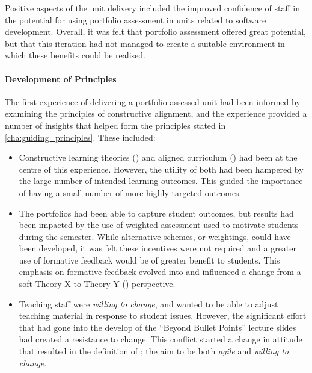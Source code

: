 Positive aspects of the unit delivery included the improved confidence of staff in the potential for using portfolio assessment in units related to software development. Overall, it was felt that portfolio assessment offered great potential, but that this iteration had not managed to create a suitable environment in which these benefits could be realised.

\paragraph{Development of Principles} %

The first experience of delivering a portfolio assessed unit had been informed by examining the principles of constructive alignment, and the experience provided a number of insights that helped form the principles stated in \cref{cha:guiding_principles}. These included:

\begin{itemize}[noitemsep,nolistsep]
	\item Constructive learning theories () and aligned curriculum () had been at the centre of this experience. However, the utility of both had been hampered by the large number of intended learning outcomes. This guided the importance of having a small number of more highly targeted outcomes.
	\item The portfolios had been able to capture student outcomes, but results had been impacted by the use of weighted assessment used to motivate students during the semester. While alternative schemes, or weightings, could have been developed, it was felt these incentives were not required and a greater use of formative feedback would be of greater benefit to students. This emphasis on formative feedback evolved into  and influenced a change from a soft Theory X to Theory Y () perspective.
	\item Teaching staff were \emph{willing to change}, and wanted to be able to adjust teaching material in response to student issues. However, the significant effort that had gone into the develop of the ``Beyond Bullet Points'' lecture slides had created a resistance to change. This conflict started a change in attitude that resulted in the definition of ; the aim to be both \emph{agile} and \emph{willing to change}.
\end{itemize}


